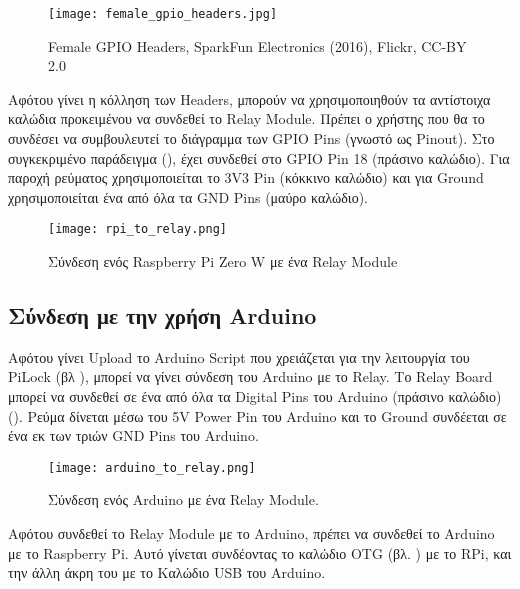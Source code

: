 		\begin{figure}[h]
			\centering
				\texttt{[image: female\_gpio\_headers.jpg]}
			\caption{Female GPIO Headers, SparkFun Electronics (2016), Flickr, CC-BY 2.0}
			\label{fig:headers}
		\end{figure}

		Αφότου γίνει η κόλληση των Headers, μπορούν να χρησιμοποιηθούν τα αντίστοιχα καλώδια προκειμένου να συνδεθεί το Relay Module. Πρέπει ο χρήστης που θα το συνδέσει να συμβουλευτεί το διάγραμμα των GPIO Pins (γνωστό ως Pinout). Στο συγκεκριμένο παράδειγμα (), έχει συνδεθεί στο GPIO Pin 18 (πράσινο καλώδιο). Για παροχή ρεύματος χρησιμοποιείται το 3V3 Pin (κόκκινο καλώδιο) και για Ground χρησιμοποιείται ένα από όλα τα GND Pins (μαύρο καλώδιο).

		\begin{figure}[h]
			\centering
				\texttt{[image: rpi\_to\_relay.png]}
			\caption{Σύνδεση ενός Raspberry Pi Zero W με ένα Relay Module}
			\label{fig:rpi_to_relay}
		\end{figure}


	\subsection{Σύνδεση με την χρήση Arduino}
		Αφότου γίνει Upload το Arduino Script που χρειάζεται για την λειτουργία του PiLock (βλ ), μπορεί να γίνει σύνδεση του Arduino με το Relay. Το Relay Board μπορεί να συνδεθεί σε ένα από όλα τα Digital Pins του Arduino (πράσινο καλώδιο) (). Ρεύμα δίνεται μέσω του 5V Power Pin του Arduino και το Ground συνδέεται σε ένα εκ των τριών GND Pins του Arduino.

		\begin{figure}[h]
			\centering
				\texttt{[image: arduino\_to\_relay.png]}
			\caption{Σύνδεση ενός Arduino με ένα Relay Module.}
			\label{fig:arduino_to_relay}
		\end{figure}

		Αφότου συνδεθεί το Relay Module με το Arduino, πρέπει να συνδεθεί το Arduino με το Raspberry Pi. Αυτό γίνεται συνδέοντας το καλώδιο OTG (βλ. ) με το RPi, και την άλλη άκρη του με το Καλώδιο USB του Arduino.
